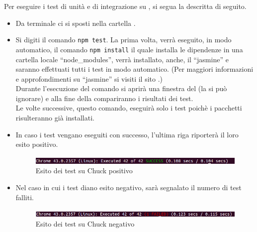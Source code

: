 				Per eseguire i test di unità e di integrazione su , si segua la  descritta di seguito.
					\begin{itemize}
						\item Da terminale ci si sposti nella cartella .
						\item Si digiti il comando \texttt{npm test}. La prima volta, verrà eseguito, in modo automatico, il comando \texttt{npm install} il quale installa le dipendenze in una cartella locale “node\_modules”, verrà installato, anche, il  “jasmine” e saranno effettuati tutti i test in modo automatico. (Per maggiori informazioni e approfondimenti su “jasmine” si visiti il sito .) \\
						Durante l'esecuzione del comando si aprirà una finestra del  (la si può ignorare) e alla fine della  compariranno i risultati dei test. \\
						Le volte successive, questo comando, eseguirà solo i test poichè i pacchetti risulteranno già installati. \\
						\item In caso i test vengano eseguiti con successo, l'ultima riga riporterà il loro esito positivo.
							\begin{figure}[H]
								\centering
								\includegraphics[scale=0.5]{Pics/testPassed.png}
								\caption{Esito dei test su Chuck positivo}
							\end{figure}
							\item Nel caso in cui i test diano esito negativo, sarà segnalato il numero di test falliti.
							\begin{figure}[H]
								\centering
								\includegraphics[scale=0.5]{Pics/testNotPassed.png}
								\caption{Esito dei test su Chuck negativo}
							\end{figure}
					\end{itemize}
					
